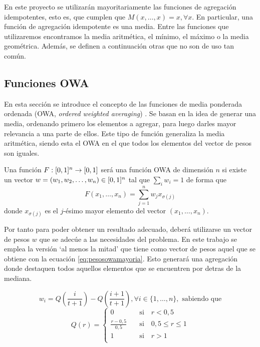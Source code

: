 En este proyecto se utilizarán mayoritariamente las funciones de agregación idempotentes, esto es, que cumplen que $M(x,\dots ,x)=x, \forall x$. En particular, una función de agregación idempotente es una media. Entre las funciones que utilizaremos encontramos la media aritmética, el mínimo, el máximo o la media geométrica. Además, se definen a continuación otras que no son de uso tan común.
\subsection{Funciones OWA}
En esta sección se introduce el concepto de las funciones de media ponderada ordenada (OWA, {\em  ordered weighted averaging}) \cite{art:yagerowa, art:paternain, art:bustinceowa}. Se basan en la idea de generar una media, ordenando primero los elementos a agregar, para luego darles mayor relevancia a una parte de ellos. Este tipo de función generaliza la media aritmética, siendo esta el OWA en el que todos los elementos del vector de pesos son iguales.

\begin{definition}\label{def:owa}
Una  función $F:[0,1]^n\rightarrow[0,1]$ será una función OWA de dimensión $n$ si existe un vector $w=(w_{1},w_{2},\dots,w_{n})\in [0,1]^{n}$ tal que $\sum_{i}w_{i}=1$ de forma que
$$F(x_{1},\dots,x_{n})=\sum^{n}_{j=1}w_{j}x_{\sigma(j)}$$
donde $x_{\sigma(j)}$ es el $j$-ésimo mayor elemento del vector $(x_{1},\dots,x_{n})$.
\end{definition}

Por tanto para poder obtener un resultado adecuado, deberá utilizarse un vector de pesos $w$ que se adecúe a las necesidades del problema. En este trabajo se emplea la versión `al menos la mitad' %
 que tiene como vector de pesos aquel que se obtiene con la ecuación \ref{eq:pesosowamayoria}. Esto generará una agregación donde destaquen todos aquellos elementos que se encuentren por detras de la mediana.

\begin{equation}\label{eq:pesosowamayoria}
	 w_i = Q\left(\frac{i}{t+1}\right) - Q\left(\frac{i+1}{t+1}\right), \forall i\in \{1, \dots, n\}, \text{   sabiendo que}
\end{equation}
	 $$Q(r) = \left\{\begin{aligned}
	 	0 					&\quad \text{si}\quad r<0,5\\
	 	\frac{r-0,5}{0,5}	&\quad \text{si}\quad 0,5\leq r\leq 1\\
	 	1 					&\quad \text{si}\quad r>1\\
	\end{aligned}\right.$$

